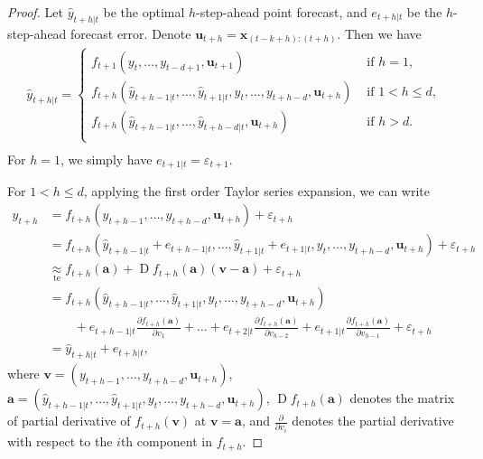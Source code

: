 \documentclass[
  11pt,
  a4paper,
]{article}
\theoremstyle{plain}
\theoremstyle{remark}
\begin{document}
\begin{proof}
Let \(\hat{y}_{t+h|t}\) be the optimal \(h\)-step-ahead point forecast,
and \(e_{t+h|t}\) be the \(h\)-step-ahead forecast error. Denote
\(\bm{u}_{t+h}=\bm{x}_{(t-k+h):(t+h)}\). Then we have \begin{align*}
\hat{y}_{t+h|t}=\begin{cases}
      f_{t+1}(y_t,\dots,y_{t-d+1},\bm{u}_{t+1}) & \text{ if } h=1, \\
      f_{t+h}(\hat{y}_{t+h-1|t},\dots,\hat{y}_{t+1|t},y_t,\dots,y_{t+h-d},\bm{u}_{t+h}) &  \text{ if } 1 < h \leq d, \\
      f_{t+h}(\hat{y}_{t+h-1|t},\dots,\hat{y}_{t+h-d|t},\bm{u}_{t+h}) & \text{ if } h > d.\\
    \end{cases}\\
\end{align*} For \(h=1\), we simply have
\(e_{t+1|t} = \varepsilon_{t+1}\).

For \(1<h\leq d\), applying the first order Taylor series expansion, we
can write \begin{align*}
y_{t+h}
&= f_{t+h}(y_{t+h-1},\dots,y_{t+h-d},\bm{u}_{t+h})+\varepsilon_{t+h} \\
&= f_{t+h}(\hat{y}_{t+h-1|t}+e_{t+h-1|t},\dots,\hat{y}_{t+1|t}+e_{t+1|t},y_{t},\dots,y_{t+h-d},\bm{u}_{t+h})+\varepsilon_{t+h} \\
&\underset{\text{te}}{\approx} f_{t+h}(\bm{a})+\operatorname{D}f_{t+h}(\bm{a})(\bm{v}-\bm{a})+
\varepsilon_{t+h} \\
&= f_{t+h}(\hat{y}_{t+h-1|t},\dots,\hat{y}_{t+1|t},y_{t},\dots,y_{t+h-d},\bm{u}_{t+h}) \\
&\mbox{}\qquad +e_{t+h-1|t}\frac{\partial f_{t+h}(\bm{a})}{\partial v_1}+\dots+e_{t+2|t}\frac{\partial f_{t+h}(\bm{a})}{\partial v_{h-2}}+e_{t+1|t}\frac{\partial f_{t+h}(\bm{a})}{\partial v_{h-1}}+\varepsilon_{t+h} \\
&=\hat{y}_{t+h|t}+e_{t+h|t},
\end{align*} where \(\bm{v}=(y_{t+h-1},\dots,y_{t+h-d},\bm{u}_{t+h})\),
\(\bm{a} =(\hat{y}_{t+h-1|t},\dots,\hat{y}_{t+1|t},y_{t},\dots,y_{t+h-d},\bm{u}_{t+h})\),
\(\operatorname{D}f_{t+h}(\bm{a})\) denotes the matrix of partial
derivative of \(f_{t+h}(\bm{v})\) at \(\bm{v}=\bm{a}\), and
\(\frac{\partial}{\partial v_i}\) denotes the partial derivative with
respect to the \(i\)th component in \(f_{t+h}\).


\end{proof}
\end{document}
